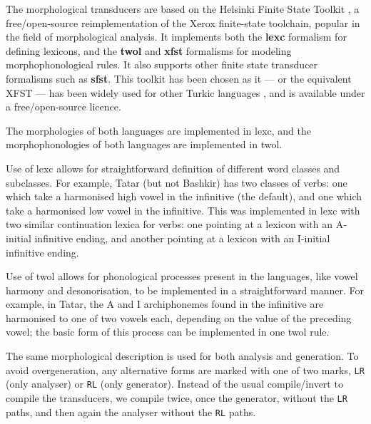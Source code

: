 \documentclass[11pt]{article}
\begin{document}
The morphological transducers are based on the Helsinki Finite State Toolkit \citep{hfst/2011}, a free/open-source reimplementation of the Xerox finite-state toolchain, popular in the field of morphological analysis. It implements both the \textbf{lexc} formalism for defining lexicons, and the \textbf{twol} and \textbf{xfst} formalisms for modeling morphophonological rules. It also supports other finite state transducer formalisms such as \textbf{sfst}. This toolkit has been chosen as it --- or the equivalent XFST --- has been widely used for other Turkic languages \citep{coltekin2010,altintas2001,tantug2006}, and is available under a free/open-source licence.

The morphologies of both languages are implemented in lexc, and the morphophonologies of both languages are implemented in twol.

Use of lexc allows for straightforward definition of different word classes and subclasses.  For example, Tatar (but not Bashkir) has two classes of verbs: one which take a harmonised high vowel in the infinitive (the default), and one which take a harmonised low vowel in the infinitive.  This was implemented in lexc with two similar continuation lexica for verbs: one pointing at a lexicon with an A-initial infinitive ending, and another pointing at a lexicon with an I-initial infinitive ending.

Use of twol allows for phonological processes present in the languages, like vowel harmony and desonorisation, to be implemented in a straightforward manner.  For example, in Tatar, the A and I archiphonemes found in the infinitive are harmonised to one of two vowels each, depending on the value of the preceding vowel; the basic form of this process can be implemented in one twol rule.

The same morphological description is used for both analysis and generation. To avoid overgeneration, any alternative forms are 
marked with one of two marks, {\tt {\small LR}} (only analyser) or {\tt {\small RL}} (only generator). Instead of the usual
compile/invert to compile the transducers, we compile twice, once the generator, without the {\tt {\small LR}} paths, and
then again the analyser without the {\tt {\small RL}} paths. 
\end{document}

